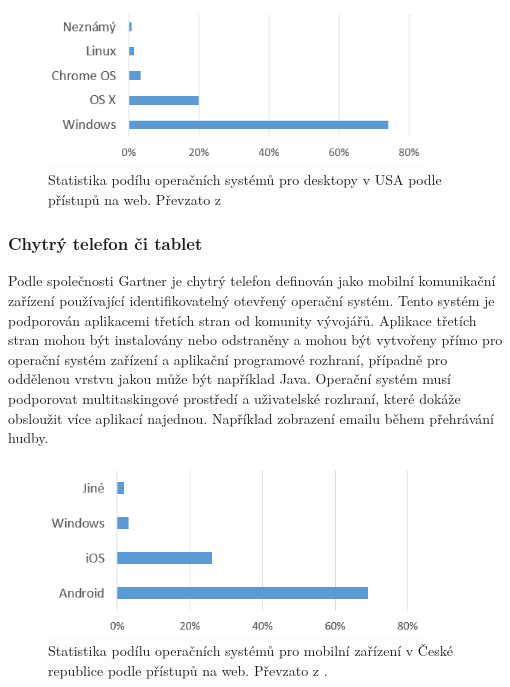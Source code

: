 \begin{figure}[h!]
\centering
\includegraphics[width=10cm]{img/2_Desktopy_US}
\caption{Statistika podílu operačních systémů pro desktopy v USA podle přístupů na web. Převzato z \cite{Statcounter1}} 
\centering
\end{figure}%
 
 
 \subsubsection{Chytrý telefon či tablet}
 Podle společnosti Gartner \cite{GartnerSmartphone} je chytrý telefon definován jako mobilní komunikační zařízení používající identifikovatelný otevřený operační systém. Tento systém je podporován aplikacemi třetích stran od komunity vývojářů. Aplikace třetích stran mohou být instalovány nebo odstraněny a mohou být vytvořeny přímo pro operační systém zařízení a aplikační programové rozhraní, případně pro oddělenou vrstvu jakou může být například Java. Operační systém musí podporovat multitaskingové prostředí a uživatelské rozhraní, které dokáže obsloužit více aplikací najednou. Například zobrazení emailu během přehrávání hudby.
 
  \begin{figure}[h!]
\centering
\includegraphics[width=10cm]{img/3_Mobil_CZ}
\caption{Statistika podílu operačních systémů pro mobilní zařízení v České republice podle přístupů na web. Převzato z \cite{Statcounter1}.} 
\centering
\end{figure}
 
